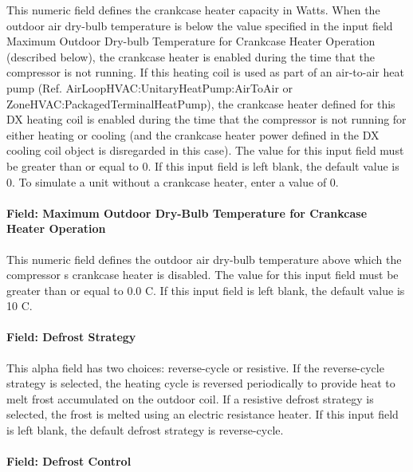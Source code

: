 This numeric field defines the crankcase heater capacity in Watts. When the outdoor air dry-bulb temperature is below the value specified in the input field Maximum Outdoor Dry-bulb Temperature for Crankcase Heater Operation (described below), the crankcase heater is enabled during the time that the compressor is not running. If this heating coil is used as part of an air-to-air heat pump (Ref. AirLoopHVAC:UnitaryHeatPump:AirToAir or ZoneHVAC:PackagedTerminalHeatPump), the crankcase heater defined for this DX heating coil is enabled during the time that the compressor is not running for either heating or cooling (and the crankcase heater power defined in the DX cooling coil object is disregarded in this case). The value for this input field must be greater than or equal to 0. If this input field is left blank, the default value is 0. To simulate a unit without a crankcase heater, enter a value of 0.

\paragraph{Field: Maximum Outdoor Dry-Bulb Temperature for Crankcase Heater Operation}\label{field-maximum-outdoor-dry-bulb-temperature-for-crankcase-heater-operation-4}

This numeric field defines the outdoor air dry-bulb temperature above which the compressor s crankcase heater is disabled. The value for this input field must be greater than or equal to 0.0 C. If this input field is left blank, the default value is 10 C.

\paragraph{Field: Defrost Strategy}\label{field-defrost-strategy}

This alpha field has two choices: reverse-cycle or resistive. If the reverse-cycle strategy is selected, the heating cycle is reversed periodically to provide heat to melt frost accumulated on the outdoor coil. If a resistive defrost strategy is selected, the frost is melted using an electric resistance heater. If this input field is left blank, the default defrost strategy is reverse-cycle.

\paragraph{Field: Defrost Control}\label{field-defrost-control}

